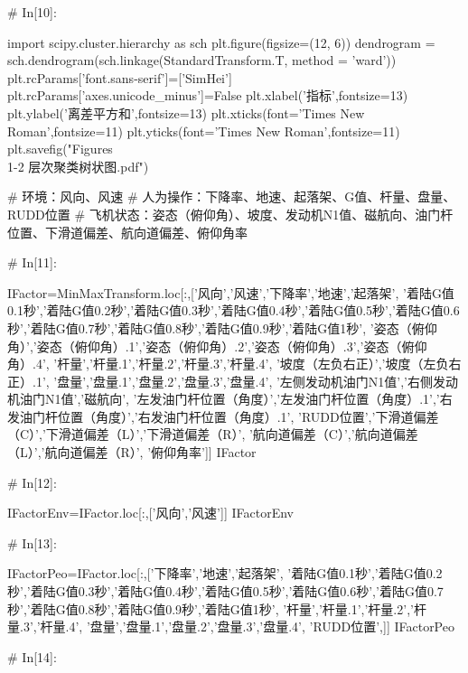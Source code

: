 \documentclass{MathorCupModeling}
\begin{document}
\begin{python}
# In[10]:


import scipy.cluster.hierarchy as sch
plt.figure(figsize=(12, 6))
dendrogram = sch.dendrogram(sch.linkage(StandardTransform.T, method = 'ward'))
plt.rcParams['font.sans-serif']=['SimHei']
plt.rcParams['axes.unicode_minus']=False
plt.xlabel('指标',fontsize=13)
plt.ylabel('离差平方和',fontsize=13)
plt.xticks(font='Times New Roman',fontsize=11)
plt.yticks(font='Times New Roman',fontsize=11)
plt.savefig("Figures\\1-2 层次聚类树状图.pdf")


# 环境：风向、风速
# 人为操作：下降率、地速、起落架、G值、杆量、盘量、RUDD位置
# 飞机状态：姿态（俯仰角）、坡度、发动机N1值、磁航向、油门杆位置、下滑道偏差、航向道偏差、俯仰角率

# In[11]:


IFactor=MinMaxTransform.loc[:,['风向','风速','下降率','地速','起落架',
                               '着陆G值0.1秒','着陆G值0.2秒','着陆G值0.3秒','着陆G值0.4秒','着陆G值0.5秒','着陆G值0.6秒','着陆G值0.7秒','着陆G值0.8秒','着陆G值0.9秒','着陆G值1秒',
                               '姿态（俯仰角）','姿态（俯仰角）.1','姿态（俯仰角）.2','姿态（俯仰角）.3','姿态（俯仰角）.4',
                               '杆量','杆量.1','杆量.2','杆量.3','杆量.4',
                               '坡度（左负右正）','坡度（左负右正）.1',
                               '盘量','盘量.1','盘量.2','盘量.3','盘量.4',
                               '左侧发动机油门N1值','右侧发动机油门N1值','磁航向',
                               '左发油门杆位置（角度）','左发油门杆位置（角度）.1','右发油门杆位置（角度）','右发油门杆位置（角度）.1',
                               'RUDD位置','下滑道偏差（C）','下滑道偏差（L）','下滑道偏差（R）',
                               '航向道偏差（C）','航向道偏差（L）','航向道偏差（R）',
                               '俯仰角率']]
IFactor


# In[12]:


IFactorEnv=IFactor.loc[:,['风向','风速']]
IFactorEnv


# In[13]:


IFactorPeo=IFactor.loc[:,['下降率','地速','起落架',
                          '着陆G值0.1秒','着陆G值0.2秒','着陆G值0.3秒','着陆G值0.4秒','着陆G值0.5秒','着陆G值0.6秒','着陆G值0.7秒','着陆G值0.8秒','着陆G值0.9秒','着陆G值1秒',
                          '杆量','杆量.1','杆量.2','杆量.3','杆量.4',
                          '盘量','盘量.1','盘量.2','盘量.3','盘量.4',
                          'RUDD位置',]]
IFactorPeo


# In[14]:



\end{python}
\end{document}
